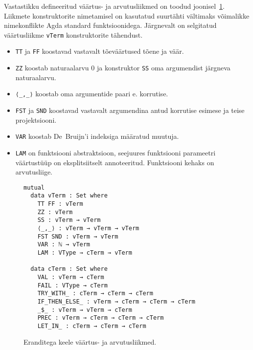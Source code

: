 \documentclass[a4paper,12pt]{article}
\begin{document}
Vastastikku defineeritud väärtus- ja arvutusliikmed on toodud joonisel~\ref{fig:exc.raw}.
Liikmete konstruktorite nimetamisel on kasutatud suurtähti vältimaks võimalikke nimekonflikte Agda standard funktsioonidega.
Järgnevalt on selgitatud väärtusliikme {\tt vTerm} konstruktorite tähendust.
\begin{itemize}
\item {\tt TT} ja {\tt FF} koostavad vastavalt tõeväärtused tõene ja väär.
\item {\tt ZZ} koostab naturaalarvu 0 ja konstruktor {\tt SS} oma argumendist järgneva naturaalarvu.
\item {\tt ⟨_,_⟩} koostab oma argumentide paari e. korrutise.
\item {\tt FST} ja {\tt SND} koostavad vastavalt argumendina antud korrutise esimese ja teise projektsiooni.
\item {\tt VAR} koostab De~Bruijn'i indeksiga määratud muutuja.
\item {\tt LAM} on funktsiooni abstraktsioon, seejuures funktsiooni parameetri väärtustüüp on eksplitsiitselt annoteeritud. Funktsiooni kehaks on arvutusliige.
\end{itemize}

\begin{figure}
  \begin{BVerbatim}
mutual
  data vTerm : Set where
    TT FF : vTerm
    ZZ : vTerm
    SS : vTerm → vTerm
    ⟨_,_⟩ : vTerm → vTerm → vTerm
    FST SND : vTerm → vTerm
    VAR : ℕ → vTerm
    LAM : VType → cTerm → vTerm

  data cTerm : Set where
    VAL : vTerm → cTerm
    FAIL : VType → cTerm
    TRY_WITH_ : cTerm → cTerm → cTerm
    IF_THEN_ELSE_ : vTerm → cTerm → cTerm → cTerm
    _$_ : vTerm → vTerm → cTerm
    PREC : vTerm → cTerm → cTerm → cTerm
    LET_IN_ : cTerm → cTerm → cTerm
  \end{BVerbatim}
  \caption{Eranditega keele väärtus- ja arvutusliikmed.}
  \label{fig:exc.raw}
\end{figure}
\end{document}
